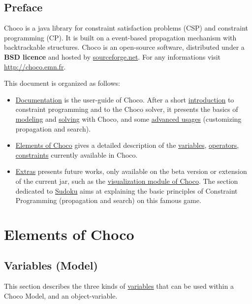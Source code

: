 \chapter*{Preface}
Choco is a java library for constraint satisfaction problems (CSP) and constraint programming (CP). It is built on a event-based propagation mechanism with backtrackable structures.
Choco is an open-source software, distributed under a \textbf{BSD licence} and hosted by \href{http://sourceforge.net/projects/choco/}{sourceforge.net}.
For any informations visit \url{http://choco.emn.fr}.
\bigskip

\noindent This document is organized as follows:
\begin{itemize}
\item \hyperlink{ch:doc}{Documentation} is the user-guide of Choco. After a short \hyperlink{doc:introduction}{introduction} to constraint programming and to the Choco solver, it presents the basics of \hyperlink{doc:model}{modeling} and \hyperlink{doc:solver}{solving} with Choco, and some \hyperlink{doc:advanced}{advanced usages} (customizing propagation and search).
\item \hyperlink{part:elements}{Elements of Choco} gives a detailed description of the \hyperlink{ch:vars}{variables}, \hyperlink{ch:operators}{operators}, \hyperlink{ch:constraints}{constraints} currently available in Choco.
\item \hyperlink{ch:extra}{Extras} presents future works, only available on the beta version or extension of the current jar, such as the \hyperlink{chocoandvisu:chocoandvisu}{visualization module of Choco}. The section dedicated to \hyperlink{sudokuandcp:sudokuandconstraintprogramming}{Sudoku} aims at explaining the basic principles of Constraint Programming (propagation and search) on this famous game.


\end{itemize}




\part{Elements of Choco}\label{part:elements}\hypertarget{part:elements}{}
\chapter{Variables (Model)}\label{ch:vars}\hypertarget{ch:vars}{}
This section describes the three kinds of \hyperlink{model:variables}{variables} that can be used within a Choco Model, and an object-variable.




